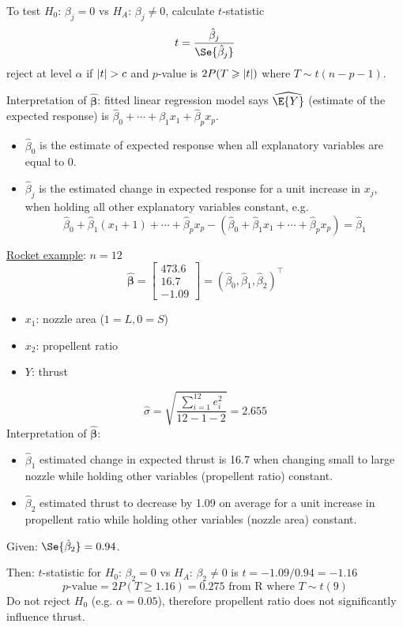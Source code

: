 To test $ H_0 $: $ \beta_j=0 $ vs $ H_A $: $ \beta_j\neq 0 $,
calculate $ t $-statistic
\[ t=\frac{\hat{\beta}_j}{\Se{\hat{\beta}_j}}  \]
reject at level $ \alpha $ if $ \lvert t\rvert>c $ and
$ p $-value is $ 2P(T\geqslant \lvert t\rvert) $ where $ T \sim t(n-p-1) $.

Interpretation of $ \hat{\symbf{\beta}} $: fitted linear
regression model says $ \widehat{\E{Y}} $
(estimate of the expected response) is
$ \hat{\beta}_0+\cdots+\beta_1x_1+\hat{\beta}_p x_p $.
\begin{itemize}
    \item $ \hat{\beta}_0 $ is the estimate of expected response
          when all explanatory variables are equal to 0.
    \item $ \hat{\beta}_j $ is the estimated change
          in expected response for a unit increase in $ x_j $,
          when holding all other explanatory variables constant,
          e.g.\
          \[ \hat{\beta}_0+\hat{\beta}_1(x_1+1)+\cdots+\hat{\beta}_p x_p
              -(\hat{\beta}_0+\hat{\beta}_1 x_1+\cdots+\hat{\beta}_p x_p)=\hat{\beta}_1 \]
\end{itemize}

\underline{Rocket example}: $ n=12 $
\[ \hat{\symbf{\beta}}=\begin{bmatrix}
        473.6 \\
        16.7  \\
        -1.09
    \end{bmatrix}=(\hat{\beta}_0,\hat{\beta}_1,\hat{\beta}_2)^\top \]
\begin{itemize}
    \item $ x_1 $: nozzle area ($ 1 = L,0=S $)
    \item $ x_2 $: propellent ratio
    \item $ Y $: thrust
\end{itemize}
\[ \hat{\sigma}=\sqrt{\frac{\sum\limits_{i=1}^{12} e_i^2}{12-1-2}}=2.655 \]
Interpretation of $ \hat{\symbf{\beta}} $:
\begin{itemize}
    \item $ \hat{\beta}_1 $ estimated change in expected thrust is 16.7
          when changing small to large nozzle while holding other variables
          (propellent ratio) constant.
    \item $ \hat{\beta}_2 $ estimated thrust to decrease by 1.09 on average
          for a unit increase in propellent ratio while holding other
          variables (nozzle area) constant.
\end{itemize}
Given: $ \Se{\hat{\beta}_2}=0.94 $.

Then: $ t $-statistic for $ H_0 $: $ \beta_2=0 $ vs $ H_A $: $ \beta_2\neq 0 $
is $ t=-1.09/0.94=-1.16 $
\[ p\text{-value}=2P(T\geqslant 1.16)=0.275\text{ from R where } T \sim t(9)\]
Do not reject $ H_0 $ (e.g. $ \alpha=0.05 $), therefore
propellent ratio does not significantly influence thrust.
